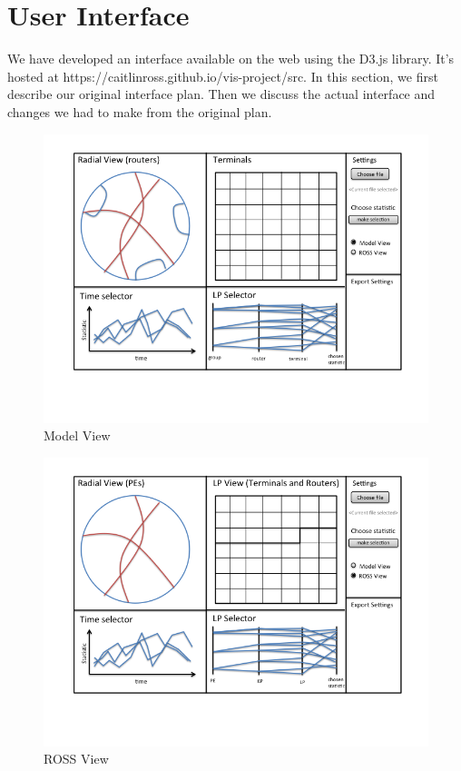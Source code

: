 \documentclass{acm_proc_article-sp}
\begin{document}
\section{User Interface}
We have developed an interface available on the web using the D3.js library.  It's hosted at https://caitlinross.github.io/vis-project/src.  In this section, we first describe our original interface plan.  Then we discuss the actual interface and changes we had to make from the original plan.  
\begin{figure}[t]
\centering
   \includegraphics[width=6.5in, clip=true, trim=0 1in 0 0]{../../figures/gui-diagram/Slide1.png}
\caption{Model View}
\label{model-view}
\end{figure}

\begin{figure}[t]
\centering
   \includegraphics[width=6.5in, clip=true, trim=0 1in 0 0]{../../figures/gui-diagram/Slide2.png}
\caption{ROSS View}
\label{ross-view}
\end{figure}
\end{document}
